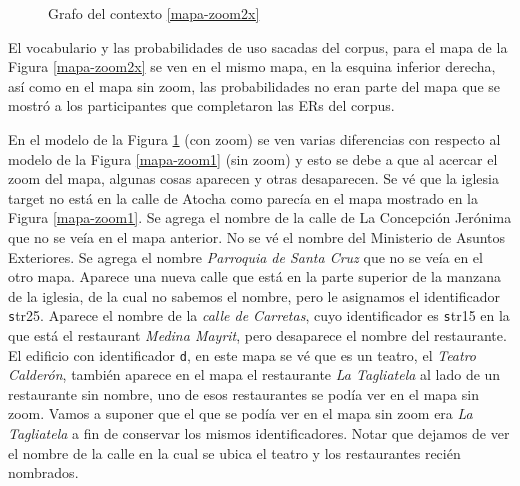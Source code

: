 \begin{figure}[H]
\caption{Grafo del contexto \ref{mapa-zoom2x}}
\label{modelo-mapa-zoom2x}
\end{figure}

El vocabulario y las probabilidades de uso sacadas del corpus, para el mapa de la Figura \ref{mapa-zoom2x} se ven en el mismo mapa, en la esquina inferior derecha, as\'i como en el mapa sin zoom, las probabilidades no eran parte del mapa que se mostr\'o a los participantes que completaron las ERs del corpus.

En el modelo de la Figura \ref{modelo-mapa-zoom2x} (con zoom) se ven varias diferencias con respecto al modelo de la Figura \ref{mapa-zoom1} 
(sin zoom) y esto se debe a que al acercar el zoom del mapa, algunas cosas aparecen y otras desaparecen. Se v\'e que la iglesia target no est\'a
 en la calle de Atocha como parec\'ia en el mapa mostrado en la Figura \ref{mapa-zoom1}. Se agrega el nombre de la calle de La Concepci\'on 
Jer\'onima que no se ve\'ia en el mapa anterior. No se v\'e el nombre del Ministerio de Asuntos Exteriores. Se agrega el nombre {\it Parroquia de Santa Cruz} que no se ve\'ia en el otro mapa. Aparece una nueva calle que est\'a en la parte superior de la manzana de la iglesia, 
de la cual no sabemos el nombre, pero le asignamos el identificador {\texttt str25}. Aparece el nombre de la {\it calle de Carretas}, 
cuyo identificador
 es {\texttt str15} en la que est\'a el restaurant {\it Medina Mayrit}, pero desaparece el nombre del restaurante. 
El edificio con identificador {\texttt d}, en este mapa se v\'e que es un teatro, el {\it Teatro Calder\'on}, tambi\'en aparece en el mapa el restaurante {\it La Tagliatela} al lado
 de un restaurante sin nombre, uno de esos restaurantes se pod\'ia ver en el mapa sin zoom. Vamos a suponer que el que se pod\'ia ver en el mapa sin zoom era {\it La Tagliatela} a fin de conservar los mismos identificadores. Notar que dejamos de ver el nombre de la calle 
en la cual se ubica el teatro y los restaurantes reci\'en nombrados.


